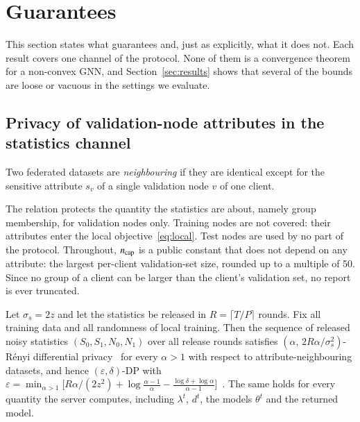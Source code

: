 \section{Guarantees}\label{sec:guarantees}

This section states what \clamp{} guarantees and, just as explicitly, what it does not. Each result covers one channel of the protocol. None of them is a convergence theorem for a non-convex GNN, and Section~\ref{sec:results} shows that several of the bounds are loose or vacuous in the settings we evaluate.

\subsection{Privacy of validation-node attributes in the statistics channel}

\begin{definition}
Two federated datasets are \emph{neighbouring} if they are identical except for the sensitive attribute $s_v$ of a single validation node $v$ of one client.
\end{definition}

The relation protects the quantity the statistics are about, namely group membership, for validation nodes only. Training nodes are not covered: their attributes enter the local objective~\eqref{eq:local}. Test nodes are used by no part of the protocol. Throughout, $n_{\mathrm{cap}}$ is a public constant that does not depend on any attribute: the largest per-client validation-set size, rounded up to a multiple of 50. Since no group of a client can be larger than the client's validation set, no report is ever truncated.

\begin{theorem}\label{thm:dp}
Let $\sigma_s=2z$ and let the statistics be released in $R=\lceil T/P\rceil$ rounds. Fix all training data and all randomness of local training. Then the sequence of released noisy statistics $(S_0,S_1,N_0,N_1)$ over all release rounds satisfies $(\alpha,\,2R\alpha/\sigma_s^2)$-R\'enyi differential privacy~\citep{mironov2017renyi} for every $\alpha>1$ with respect to attribute-neighbouring datasets, and hence $(\varepsilon,\delta)$-DP with $\varepsilon=\min_{\alpha>1}\bigl[R\alpha/(2z^2)+\log\frac{\alpha-1}{\alpha}-\frac{\log\delta+\log\alpha}{\alpha-1}\bigr]$~\citep{canonne2020discrete}. The same holds for every quantity the server computes, including $\lambda^t$, $d^t$, the models $\theta^t$ and the returned model.
\end{theorem}

